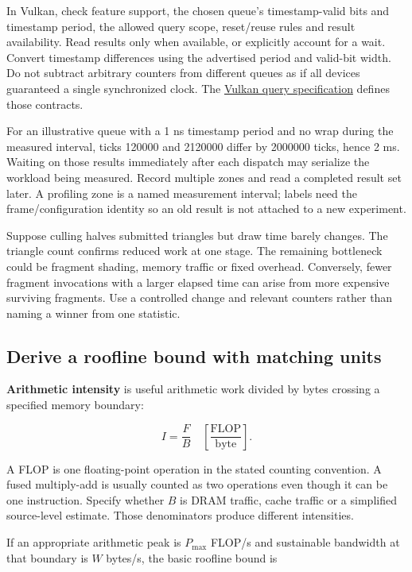 In Vulkan, check feature support, the chosen queue's timestamp-valid bits and timestamp period, the allowed query scope, reset/reuse rules and result availability. Read results only when available, or explicitly account for a wait. Convert timestamp differences using the advertised period and valid-bit width. Do not subtract arbitrary counters from different queues as if all devices guaranteed a single synchronized clock. The \href{https://docs.vulkan.org/spec/latest/chapters/queries.html}{Vulkan query specification} defines those contracts.

For an illustrative queue with a 1 ns timestamp period and no wrap during the measured interval, ticks 120000 and 2120000 differ by 2000000 ticks, hence 2 ms. Waiting on those results immediately after each dispatch may serialize the workload being measured. Record multiple zones and read a completed result set later. A profiling zone is a named measurement interval; labels need the frame/configuration identity so an old result is not attached to a new experiment.

Suppose culling halves submitted triangles but draw time barely changes. The triangle count confirms reduced work at one stage. The remaining bottleneck could be fragment shading, memory traffic or fixed overhead. Conversely, fewer fragment invocations with a larger elapsed time can arise from more expensive surviving fragments. Use a controlled change and relevant counters rather than naming a winner from one statistic.

\subsection{Derive a roofline bound with matching units}\label{03-visual-computing-i-ch016-derive-a-roofline-bound-with-matching-units}

\textbf{Arithmetic intensity} is useful arithmetic work divided by bytes crossing a specified memory boundary:

\[
I=\frac{F}{B}\quad\left[\frac{\mathrm{FLOP}}{\mathrm{byte}}\right].
\]

A FLOP is one floating-point operation in the stated counting convention. A fused multiply-add is usually counted as two operations even though it can be one instruction. Specify whether \(B\) is DRAM traffic, cache traffic or a simplified source-level estimate. Those denominators produce different intensities.

If an appropriate arithmetic peak is \(P_{\max}\) FLOP/s and sustainable bandwidth at that boundary is \(W\) bytes/s, the basic roofline bound is

